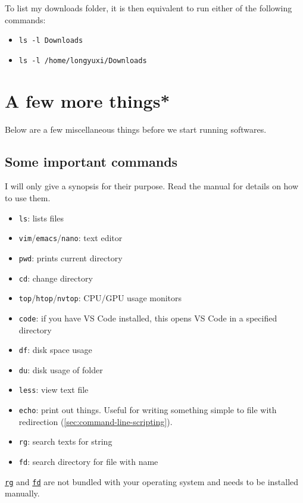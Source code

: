 \documentclass[12pt,letterpaper]{article}
\begin{document}
To list my downloads folder, it is then equivalent to run either of the following commands:

\begin{itemize}
   \item \texttt{ls -l Downloads}
   \item \texttt{ls -l /home/longyuxi/Downloads}
\end{itemize}

\section{A few more things*}

Below are a few miscellaneous things before we start running softwares.

\subsection{Some important commands}

I will only give a synopsis for their purpose. Read the manual for details on how to use them.

\begin{itemize}
   \item \texttt{ls}: lists files
   \item \texttt{vim}/\texttt{emacs}/\texttt{nano}: text editor
   \item \texttt{pwd}: prints current directory
   \item \texttt{cd}: change directory
   \item \texttt{top}/\texttt{htop}/\texttt{nvtop}: CPU/GPU usage monitors
   \item \texttt{code}: if you have VS Code installed, this opens VS Code in a specified directory
   \item \texttt{df}: disk space usage
   \item \texttt{du}: disk usage of folder
   \item \texttt{less}: view text file
   \item \texttt{echo}: print out things. Useful for writing something simple to file with redirection (\cref{sec:command-line-scripting}).
   \item \texttt{rg}: search texts for string
   \item \texttt{fd}: search directory for file with name
\end{itemize}

\href{https://github.com/BurntSushi/ripgrep}{\texttt{rg}} and \href{https://github.com/sharkdp/fd}{\texttt{fd}} are not bundled with your operating system and needs to be installed manually.
\end{document}
